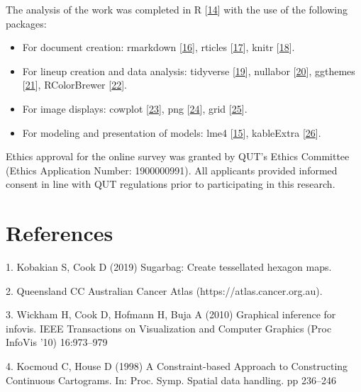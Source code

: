 \documentclass[conference,final,]{IEEEtran}
\providecommand{\tightlist}{%
  \setlength{\itemsep}{0pt}\setlength{\parskip}{0pt}}
\begin{document}
The analysis of the work was completed in R {[}\protect\hyperlink{ref-RCore}{14}{]} with the use of the following packages:

\begin{itemize}
\tightlist
\item
  For document creation: rmarkdown {[}\protect\hyperlink{ref-rmarkdown}{16}{]}, rticles {[}\protect\hyperlink{ref-rticles}{17}{]}, knitr {[}\protect\hyperlink{ref-knitr}{18}{]}.
\item
  For lineup creation and data analysis: tidyverse {[}\protect\hyperlink{ref-tidyverse}{19}{]}, nullabor {[}\protect\hyperlink{ref-nullabor}{20}{]}, ggthemes {[}\protect\hyperlink{ref-ggthemes}{21}{]}, RColorBrewer {[}\protect\hyperlink{ref-RColorBrewer}{22}{]}.
\item
  For image displays: cowplot {[}\protect\hyperlink{ref-cowplot}{23}{]}, png {[}\protect\hyperlink{ref-png}{24}{]}, grid {[}\protect\hyperlink{ref-grid}{25}{]}.
\item
  For modeling and presentation of models: lme4 {[}\protect\hyperlink{ref-lme4}{15}{]}, kableExtra {[}\protect\hyperlink{ref-kableExtra}{26}{]}.
\end{itemize}

Ethics approval for the online survey was granted by QUT's Ethics Committee (Ethics Application Number: 1900000991). All applicants provided informed consent in line with QUT regulations prior to participating in this research.

\newpage

\hypertarget{references-1}{%
\section{References}\label{references-1}}

\hypertarget{refs}{}
\leavevmode\hypertarget{ref-sugarbag}{}%
1. Kobakian S, Cook D (2019) Sugarbag: Create tessellated hexagon maps.

\leavevmode\hypertarget{ref-atlas}{}%
2. Queensland CC Australian Cancer Atlas (https://atlas.cancer.org.au).

\leavevmode\hypertarget{ref-GIIV}{}%
3. Wickham H, Cook D, Hofmann H, Buja A (2010) Graphical inference for infovis. IEEE Transactions on Visualization and Computer Graphics (Proc InfoVis '10) 16:973--979

\leavevmode\hypertarget{ref-CBATCC}{}%
4. Kocmoud C, House D (1998) A Constraint-based Approach to Constructing Continuous Cartograms. In: Proc. Symp. Spatial data handling. pp 236--246
\end{document}
